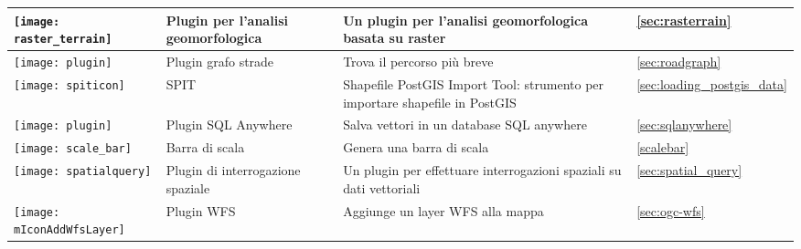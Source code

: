 {\begin{longtable}{|p{1.2cm}|p{3.8cm}|p{7.5cm}|p{3cm}|}
\hline
\texttt{[image: raster\_terrain]}
& Plugin per l'analisi geomorfologica \index{plugins!analisi raster}& Un plugin per l'analisi geomorfologica basata su raster &  \ref{sec:rasterrain}\\
\hline
\texttt{[image: plugin]}
 & Plugin grafo strade\index{plugins!grafo strade} & Trova il percorso più breve &  \ref{sec:roadgraph} \\
\hline
\texttt{[image: spiticon]}
 & SPIT \index{plugins!spit} & Shapefile PostGIS Import Tool: strumento per importare shapefile in PostGIS &  \ref{sec:loading_postgis_data} \\
 \hline
\texttt{[image: plugin]}
 & Plugin SQL Anywhere \index{plugins!SQL anywhere} & Salva vettori in un database SQL anywhere &  \ref{sec:sqlanywhere} \\
 \hline
\texttt{[image: scale\_bar]}
 & Barra di scala \index{plugins!barra di scala}& Genera una barra di scala &  \ref{scalebar} \\
\hline
\texttt{[image: spatialquery]}
 & Plugin di interrogazione spaziale & Un plugin per effettuare interrogazioni spaziali su dati vettoriali &  \ref{sec:spatial_query} \\
\hline
\texttt{[image: mIconAddWfsLayer]}
 & Plugin WFS & Aggiunge un layer WFS alla mappa &  \ref{sec:ogc-wfs} \\
\hline
\end{longtable}}

\newpage